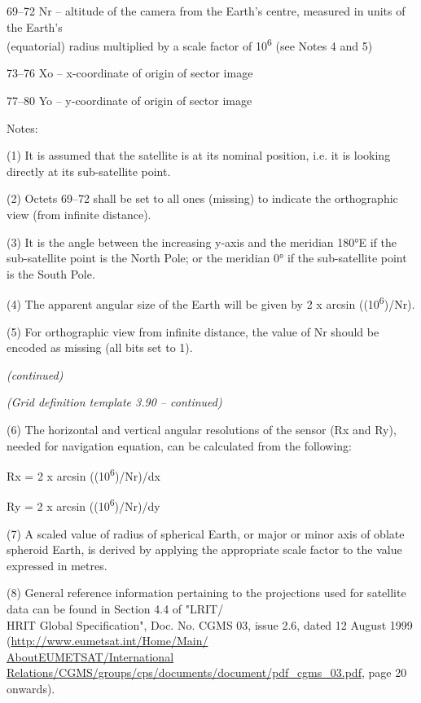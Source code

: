 69--72 Nr -- altitude of the camera from the Earth's centre, measured in units of the Earth's\\
(equatorial) radius multiplied by a scale factor of 10\textsuperscript{6} (see Notes 4 and 5)

73--76 Xo -- x-coordinate of origin of sector image

77--80 Yo -- y-coordinate of origin of sector image

Notes:

(1) It is assumed that the satellite is at its nominal position, i.e. it is looking directly at its sub-satellite point.

(2) Octets 69--72 shall be set to all ones (missing) to indicate the orthographic view (from infinite distance).

(3) It is the angle between the increasing y-axis and the meridian 180°E if the sub-satellite point is the North Pole; or the meridian 0° if the sub-satellite point is the South Pole.

(4) The apparent angular size of the Earth will be given by 2 x arcsin ((10\textsuperscript{6})/Nr).

(5) For orthographic view from infinite distance, the value of Nr should be encoded as missing (all bits set to 1).

\emph{(continued)}

\emph{(Grid definition template 3.90 -- continued)}

(6) The horizontal and vertical angular resolutions of the sensor (Rx and Ry), needed for navigation equation, can be calculated from the following:

Rx = 2 x arcsin ((10\textsuperscript{6})/Nr)/dx

Ry = 2 x arcsin ((10\textsuperscript{6})/Nr)/dy

(7) A scaled value of radius of spherical Earth, or major or minor axis of oblate spheroid Earth, is derived by applying the appropriate scale factor to the value expressed in metres.

(8) General reference information pertaining to the projections used for satellite data can be found in Section 4.4 of "LRIT/\\
HRIT Global Specification", Doc. No. CGMS 03, issue 2.6, dated 12 August 1999 (\href{http://www.eumetsat.int/Home/Main/AboutEUMETSAT/International\%20Relations/CGMS/groups/cps/documents/document/pdf_cgms_03.pdf}{http://www.eumetsat.int/Home/Main/\\
AboutEUMETSAT/International Relations/CGMS/groups/cps/documents/document/pdf\_cgms\_03.pdf}, page 20 onwards).

